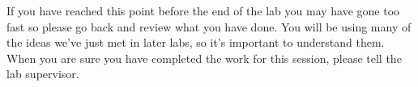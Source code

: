 If you have reached this point before the end of the lab you may have gone too fast so please go back and review what you have done. You will be using many of the ideas we've just met in later labs, so it's important to understand them.
When you are sure you have completed the work for this session, please tell the lab supervisor.



